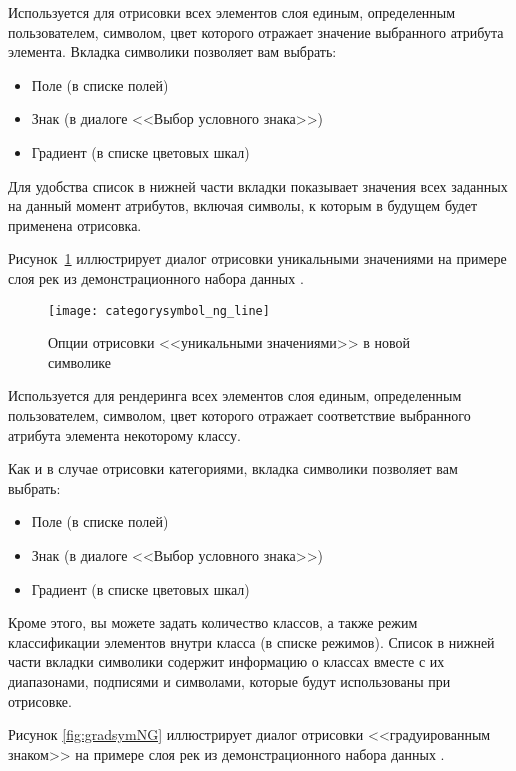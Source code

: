 
Используется для отрисовки всех элементов слоя единым, определенным
пользователем, символом, цвет которого отражает значение выбранного
атрибута элемента. Вкладка символики позволяет вам выбрать:

\begin{itemize}[label=--]
\item Поле (в списке полей)
\item Знак (в диалоге <<Выбор условного знака>>)
\item Градиент (в списке цветовых шкал)
\end{itemize}

Для удобства список в нижней части вкладки показывает значения всех заданных
на данный момент атрибутов, включая символы, к которым в будущем
будет применена отрисовка.

Рисунок~\ref{fig:catsymNG} иллюстрирует диалог отрисовки уникальными значениями
на примере слоя рек из демонстрационного набора данных \qg.

\begin{figure}[ht]
   \centering
   \texttt{[image: categorysymbol\_ng\_line]}
   \caption{Опции отрисовки <<уникальными значениями>> в новой символике \wincaption}\label{fig:catsymNG}
\end{figure}


Используется для рендеринга всех элементов слоя единым, определенным
пользователем, символом, цвет которого отражает соответствие
выбранного атрибута элемента некоторому классу.

Как и в случае отрисовки категориями, вкладка символики позволяет вам выбрать:

\begin{itemize}[label=--]
\item Поле (в списке полей)
\item Знак (в диалоге <<Выбор условного знака>>)
\item Градиент (в списке цветовых шкал)
\end{itemize}

Кроме этого, вы можете задать количество классов, а также режим классификации
элементов внутри класса (в списке режимов). Список в нижней части вкладки
символики содержит информацию о классах вместе с их диапазонами, подписями
и символами, которые будут использованы при отрисовке.

Рисунок \ref{fig:gradsymNG} иллюстрирует диалог отрисовки
<<градуированным знаком>> на примере слоя рек из демонстрационного набора данных \qg.


